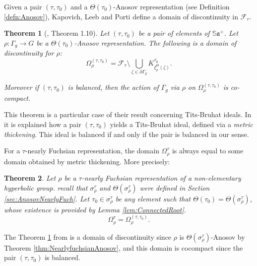 \documentclass[reqno,10pt]{amsart}
\theoremstyle{plain}
\newtheorem{thm}{Theorem}[section]
\theoremstyle{definition}
\theoremstyle{remark}
\newcommand{\type}{\tau}
\newcommand{\typeS}{{\tau_0}}
\newcommand{\Sph}{\mathbb{S}}
\begin{document}
\medskip

Given a pair $(\type,\typeS)$ and a $\Theta(\typeS)$-Anosov representation (see Definition \ref{defn:Anosov}), Kapovich, Leeb and Porti define a domain of discontinuity in $\mathcal{F}_\type$. 

\begin{thm}[{\cite{KLP-DoD}, Theorem 1.10}]
\label{thm:KLPDoD}
Let $(\type,\typeS)$ be a pair of elements of $\Sph\mathfrak{a}^+$. Let $\rho:\Gamma_g\to G$ be a $\Theta(\typeS)$-Anosov representation.  The following is a domain of discontinuity for $\rho$:
$$\Omega_\rho^{(\type,\typeS)}=\mathcal{F}_\type\setminus \bigcup_{\zeta\in \partial\Gamma_g}K^\typeS_{\xi_\rho^{\Theta}(\zeta)}.$$

Moreover if $(\type,\typeS)$ is balanced, then the action of $\Gamma_g$ via $\rho$ on $\Omega_\rho^{(\type,\typeS)}$ is co-compact.
\end{thm}

This theorem is a particular case of their result concerning Tits-Bruhat ideals. In \cite{KLP-DoD} it is explained how a pair $(\type, \typeS)$ yields a Tits-Bruhat ideal, defined via a \emph{metric thickening}. This ideal is balanced if and only if the pair is balanced in our sense.

\medskip

For a $\type$-nearly Fuchsian representation, the domain $\Omega_\rho^\type$ is always equal to some domain obtained by metric thickening. More precisely:

\begin{thm}
\label{thm:ComparaisonTotallyGeodesic}
Let $\rho$ be a $\type$-nearly Fuchsian representation of a non-elementary hyperbolic group. recall that $\sigma^\type_\rho$ and $\Theta(\sigma^\type_\rho)$ were defined in Section \ref{sec:AnosovNearlyFuch}.
Let $\typeS\in \sigma^\type_\rho$ be any element such that $\Theta(\typeS)=\Theta(\sigma^\type_\rho)$, whose existence is provided by Lemma \ref{lem:ConnectedRoot}. 
$$\Omega_\rho^\type=\Omega^{(\type,\typeS)}_\rho. $$
\end{thm}

 The Theorem \ref{thm:KLPDoD} from \cite{KLP-DoD} is a domain of discontinuity since $\rho$ is $\Theta(\sigma_\rho^\type)$-Anosov by Theorem \ref{thm:NearlyfuchsianAnosov}, and this domain is cocompact since the pair $(\type,\typeS)$ is balanced. 
\end{document}

